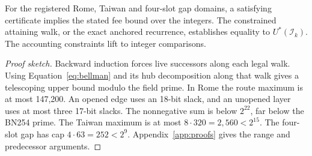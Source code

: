 \begin{lemma}
\label{lem:lift}
For the registered Rome, Taiwan and four-slot gap domains, a satisfying certificate implies the stated fee bound over the integers. The constrained attaining walk, or the exact anchored recurrence, establishes equality to $U^*(\mathcal I_k)$. The accounting constraints lift to integer comparisons.
\end{lemma}

\begin{proof}[Proof sketch]
Backward induction forces live successors along each legal walk. Using Equation~\eqref{eq:bellman} and its hub decomposition along that walk gives a telescoping upper bound modulo the field prime. In Rome the route maximum is at most 147,200. An opened edge uses an 18-bit slack, and an unopened layer uses at most three 17-bit slacks. The nonnegative sum is below $2^{22}$, far below the BN254 prime. The Taiwan maximum is at most $8\cdot320=2{,}560<2^{15}$. The four-slot gap has cap $4\cdot63=252<2^9$. Appendix~\ref{app:proofs} gives the range and predecessor arguments.
\end{proof}
